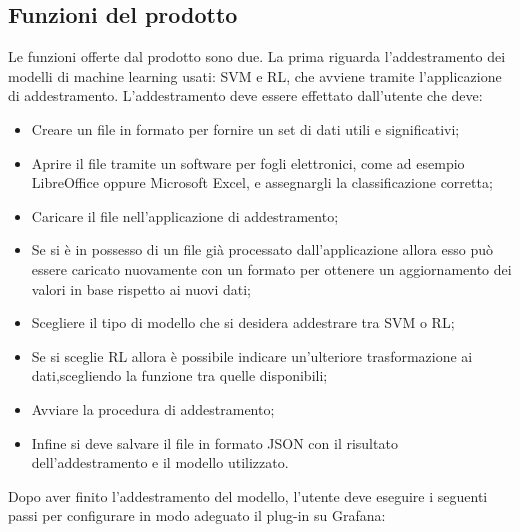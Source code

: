 \documentclass[../analisi-dei-requisiti.tex]{subfiles}
\begin{document}
\subsection{Funzioni del prodotto}
\label{subs:funzioni_del_prodotto}
	Le funzioni offerte dal prodotto sono due.
	La prima riguarda l'addestramento dei modelli di machine learning usati: SVM e RL, che avviene tramite l'applicazione di addestramento. L'addestramento deve essere effettato dall'utente che deve:
	\begin{itemize}
		\item{Creare un file in formato  per fornire un set di dati utili e significativi;}
		\item{Aprire il file tramite un software per fogli elettronici, come ad esempio LibreOffice oppure Microsoft Excel, e assegnargli la classificazione corretta;}
		\item{Caricare il file nell'applicazione di addestramento;}
		\item{Se si è in possesso di un file già processato dall'applicazione allora esso può essere caricato nuovamente con un formato  per ottenere un aggiornamento dei valori in base rispetto ai nuovi dati;}
		\item{Scegliere il tipo di modello che si desidera addestrare tra SVM o RL;}
		\item{Se si sceglie RL allora è possibile indicare un'ulteriore trasformazione ai dati,scegliendo la funzione tra quelle disponibili;}
		\item{Avviare la procedura di addestramento;}
		\item{Infine si deve salvare il file in formato JSON con il risultato dell'addestramento e il modello utilizzato.}
	\end{itemize}
	Dopo aver finito l'addestramento del modello, l'utente deve eseguire i seguenti passi per configurare in modo adeguato il plug-in su Grafana:
\end{document}
